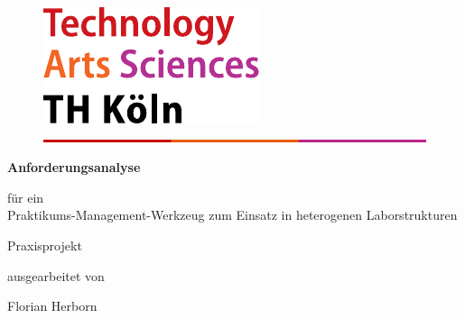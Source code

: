 \begin{titlepage}
\newcommand{\distance}{1.2cm}
\begin{center}
\begin{figure}[!ht]
	\flushright
		\includegraphics[width=.2\textwidth]{images/logo.pdf}
		\includegraphics[width=\textwidth]{images/balken.png}
\end{figure}

\vspace{\distance}

\begin{rmfamily}
\begin{huge}
\textbf{Anforderungsanalyse }\\	
\end{huge}
\vspace{0.5cm}
\begin{LARGE}
für ein\\ Praktikums-Management-Werkzeug zum Einsatz in heterogenen Laborstrukturen\\
\end{LARGE}
\end{rmfamily}

\vspace{1.0cm}



\begin{LARGE}
\begin{scshape}
Praxisprojekt\\[0.6em]
\end{scshape}
\end{LARGE}

\begin{large}
ausgearbeitet von\\
\begin{LARGE}
Florian Herborn\\
\end{LARGE}
\end{large}


\end{center}
\end{titlepage}
